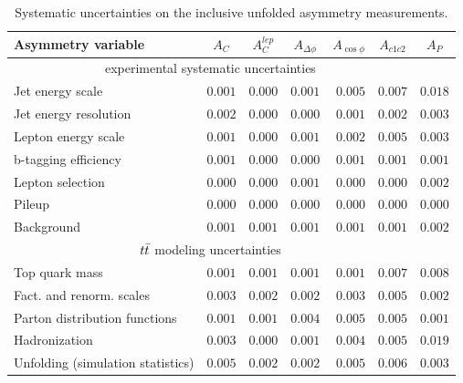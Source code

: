 \begin{table}[!h]
\begin{center}
\caption{Systematic uncertainties on the inclusive unfolded asymmetry measurements.}
\label{tab:afb:systematics}
\begin{tabular}{l||r|r|r|r|r|r}
\hline
Asymmetry variable              &       \multicolumn{1}{c|}{$A_{C}$}            &       \multicolumn{1}{c|}{$A^{lep}_{C}$}
        &       \multicolumn{1}{c|}{$A_{\Delta\phi}$}           &       \multicolumn{1}{c|}{$A_{\cos\phi}$}  &       \multicolumn{1}{c|}{$A_{c1c2}$}  &       \multicolumn{1}{c|}{$A_{P}$}  \\
\hline
\hline
\multicolumn{6}{c}{experimental systematic uncertainties} \\
\hline
Jet energy scale                  & $0.001$   & $0.000$   & $0.001$   & $0.005$   & $0.007$   & $0.018$   \\
Jet energy resolution             & $0.002$   & $0.000$   & $0.000$   & $0.001$   & $0.002$   & $0.003$   \\
Lepton energy scale               & $0.001$   & $0.000$   & $0.001$   & $0.002$   & $0.005$   & $0.003$   \\
b-tagging efficiency              & $0.001$   & $0.000$   & $0.000$   & $0.001$   & $0.001$   & $0.001$   \\
Lepton selection                  & $0.000$   & $0.000$   & $0.001$   & $0.000$   & $0.000$   & $0.002$   \\
Pileup                            & $0.000$   & $0.000$   & $0.000$   & $0.000$   & $0.000$   & $0.000$   \\
Background                        & $0.001$   & $0.001$   & $0.001$   & $0.001$   & $0.001$   & $0.002$   \\
\hline
\hline
\multicolumn{6}{c}{$t\bar{t}$ modeling uncertainties} \\
\hline
Top quark mass                    & $0.001$   & $0.001$   & $0.001$   & $0.001$   & $0.007$   & $0.008$   \\
Fact. and renorm. scales          & $0.003$   & $0.002$   & $0.002$   & $0.003$   & $0.005$   & $0.002$   \\
Parton distribution functions     & $0.001$   & $0.001$   & $0.004$   & $0.005$   & $0.005$   & $0.001$   \\
Hadronization                     & $0.003$   & $0.000$   & $0.001$   & $0.004$   & $0.005$   & $0.019$   \\
\hline
\hline
Unfolding (simulation statistics) & $0.005$   & $0.002$   & $0.002$   & $0.005$   & $0.006$   & $0.003$   \\

\end{tabular}
\end{center}
\end{table}
